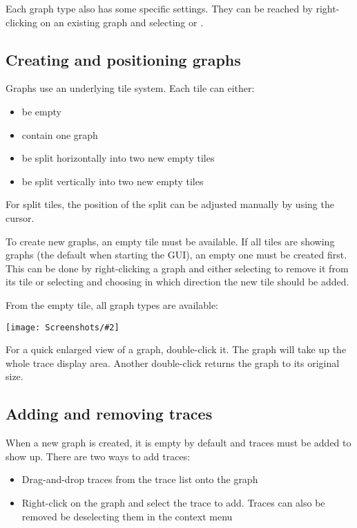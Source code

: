 \documentclass[a4paper,11pt]{article}
\newcommand\info[1][5ex]{%
  \renewcommand\stacktype{L}%
  \scaleto{\stackon[1.2pt]{\color{blue}$\bigcirc$}{\raisebox{-1.5pt}{\small i}}}{#1}%
}
\newenvironment{information}[1][]{%
   \begin{mdframed}[%
      backgroundcolor={blue!15}, hidealllines=true,
      skipabove=0.7\baselineskip, skipbelow=0.7\baselineskip,
      splitbottomskip=2pt, splittopskip=4pt, #1]%
   \makebox[0pt]{%
      \smash{%
         \hspace*{-45pt}%
         \raisebox{-5pt}{%
            {\info}%
         }%
      }%
   }%
}{\end{mdframed}}
\newcommand{\screenshot}[2]{\begin{center}
\texttt{[image: Screenshots/\#2]}
\end{center}}
\begin{document}
Each graph type also has some specific settings. They can be reached by right-clicking on an existing graph and selecting  or .

\subsection{Creating and positioning graphs}
Graphs use an underlying tile system. Each tile can either:
\begin{itemize}
\item be empty
\item contain one graph
\item be split horizontally into two new empty tiles
\item be split vertically into two new empty tiles
\end{itemize}
For split tiles, the position of the split can be adjusted manually by using the cursor.

To create new graphs, an empty tile must be available. If all tiles are showing graphs (the default when starting the GUI), an empty one must be created first. This can be done by right-clicking a graph and either selecting  to remove it from its tile or selecting  and choosing in which direction the new tile should be added.

From the empty tile, all graph types are available:
\screenshot{0.5}{GraphEmptyTile.png}

\begin{information}
For a quick enlarged view of a graph, double-click it. The graph will take up the whole trace display area. Another double-click returns the graph to its original size.
\end{information}

\subsection{Adding and removing traces}
When a new graph is created, it is empty by default and traces must be added to show up. There are two ways to add traces:
\begin{itemize}
\item Drag-and-drop traces from the trace list onto the graph
\item Right-click on the graph and select the trace to add. Traces can also be removed be deselecting them in the context menu
\end{itemize}
\end{document}
